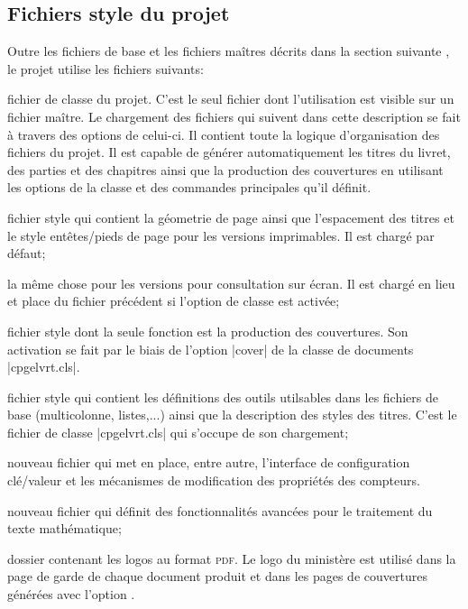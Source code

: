 \documentclass[other,11pt,fonts,openany]{cpgelvrt}
\let\OPT\opt
\renewcommand\opt[1]{{\spotcolor\OPT{#1}}}
\let\STY\sty
\renewcommand\sty[1]{{\color{fs}\STY{#1}}}
\begin{document}
\subsection{Fichiers style du projet} \label{sec:files}
Outre les fichiers de base et les fichiers maîtres d\'ecrits dans la section suivante , le projet utilise les fichiers suivants: 
\begin{description}[font=\sty, itemindent=-1em]
\item [cpgelvrt.cls] fichier de classe du projet. C'est le seul fichier dont l'utilisation est visible sur un fichier maître. Le chargement des fichiers qui suivent dans cette description se fait à travers des options de celui-ci. Il contient toute la logique d'organisation des fichiers du projet. Il est capable de g\'en\'erer automatiquement les titres du livret, des parties et des chapitres ainsi que la production des couvertures en utilisant les options de la classe et  des commandes principales qu'il d\'efinit.
\item [lvrtprint.sty] fichier style qui contient la géometrie de page ainsi que l'espacement des titres et le style entêtes/pieds de page pour les versions imprimables. Il est chargé par défaut; 
\item [lvrtscreen.sty] la même chose pour les versions pour consultation sur écran. Il est chargé en lieu et place du fichier précédent si l'option de classe  est activée; 
\item[lvrtcover.sty] fichier style dont la seule fonction est la production des couvertures. Son activation se fait par le biais de l'option |cover| de la classe de documents |cpgelvrt.cls|. 
\item[lvrtcommon.sty] fichier style qui contient les définitions des outils utilsables dans les fichiers de base (multicolonne, listes,...) ainsi que la description des styles des titres. C'est le fichier de classe |cpgelvrt.cls| qui s'occupe de son chargement;
\item[lvrtbase.sty] nouveau fichier qui met en place, entre autre, l'interface de configuration clé/valeur et les mécanismes de modification des propriétés des compteurs.  
\item[lvrtmath.sty] nouveau fichier qui définit des fonctionnalités avancées pour le traitement du texte mathématique; 
\item [Logos] dossier contenant les logos au format \textsc{pdf}. Le logo du ministère est utilisé dans la page de garde de chaque document produit et dans les pages de couvertures générées avec l'option .
\end{description}
\end{document}
